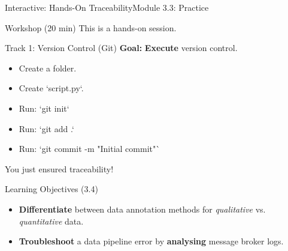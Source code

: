 \begin{frame}{Interactive: Hands-On Traceability}{Module 3.3: Practice}
    \begin{block}{Workshop (20 min)}
        This is a hands-on session.
    \end{block}
        \begin{block}{Track 1: Version Control (Git)}
            \textbf{Goal:} \textbf{Execute} version control.
            \pause
            \begin{itemize}
                \item Create a folder.
                \item Create `script.py`.
                \item Run: `git init`
                \item Run: `git add .`
                \item Run: `git commit -m "Initial commit"`
            \end{itemize}
            You just ensured traceability!
        \end{block}

\end{frame}

\begin{frame}{Learning Objectives (3.4)}
    \begin{itemize}
        \item \textbf{Differentiate} between data annotation methods for \emph{qualitative} vs. \emph{quantitative} data.
        \item \textbf{Troubleshoot} a data pipeline error by \textbf{analysing} message broker logs.
    \end{itemize}
\end{frame}

